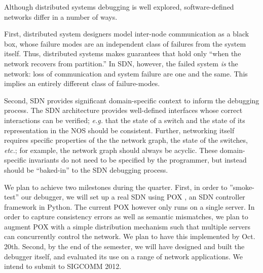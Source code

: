 \documentclass{sig-alternate-10pt}
\newcommand{\eg}{{\it e.g.}}
\newcommand{\etc}{{\it etc.}}
\begin{document}
Although distributed systems debugging is well explored,
 software-defined networks differ in a number of ways.

	First, distributed system designers model inter-node communication as a black box, whose failure modes are an independent class of failures from the system itself.
	Thus, distributed systems makes guarantees that hold only ``when the network recovers from partition.''
	In SDN, however, the failed system {\it is} the network: loss of
    communication and system failure are one and the same. This implies an
    entirely different class of failure-modes.

	Second, SDN provides significant domain-specific context to inform the debugging process.
	The  SDN architecture provides well-defined interfaces whose correct interactions can be verified; \eg{} that the state of a switch and the state of its representation in the NOS should be consistent.
	Further, networking itself requires specific properties of the the network graph, the state of the switches, \etc{}; for example, the network graph should always be acyclic.
	These domain-specific invariants do not need to be specified by the programmer, but instead should be ``baked-in'' to the SDN debugging process.


We plan to achieve two milestones during the quarter. First, in order to
''smoke-test'' our debugger, we will set up a real SDN using POX \cite{POX}, an SDN controller framework in Python.
The current POX however only runs on a single server.
In order to capture consistency errors as well as semantic mismatches, we plan to augment POX
with a simple distribution mechanism such that multiple servers can concurrently control the
network. We plan to have this implemented by Oct. 20th. Second, 
by the end of the semester, we will have designed and built the
debugger itself, and evaluated its use on a range of network applications. We intend to submit to SIGCOMM 2012.

\scriptsize



%
\end{document}
